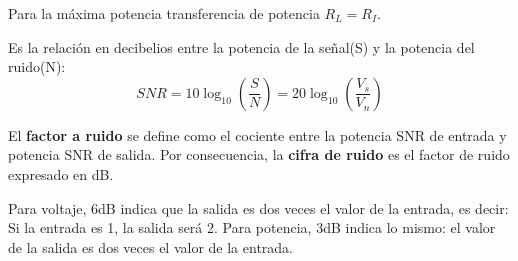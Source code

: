 \documentclass[
	12pt, %
	fleqn, %
	a4paper, %
	oneside, %
]{LegrandOrangeBook}
\begin{document}
\begin{notation}
Para la máxima potencia transferencia de potencia $R_L=R_I$.
\end{notation}
\begin{definition}
Es la relación en decibelios entre la potencia de la señal(S) y la potencia del ruido(N):
\begin{equation}
\label{eq:snr}
SNR=10\log_{10}\left(\frac{S}{N}\right)=20\log_{10}\left(\frac{V_s}{V_n}\right)
\end{equation}
\end{definition}
\begin{remark}
El \textbf{factor a ruido} se define como el cociente entre la potencia SNR de entrada y potencia SNR de salida. Por consecuencia, la \textbf{cifra de ruido} es el factor de ruido expresado en dB.
\end{remark}
\begin{notation}
Para voltaje, 6dB indica que la salida es dos veces el valor de la entrada, es decir: Si la entrada es 1, la salida será 2. Para potencia, 3dB indica lo mismo: el valor de la salida es dos veces el valor de la entrada.
\end{notation}
\end{document}
